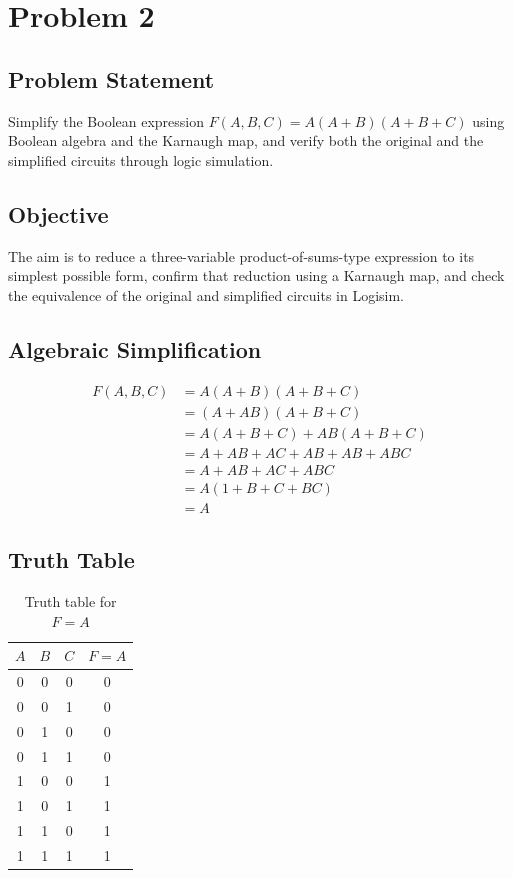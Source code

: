 \documentclass[12pt,a4paper]{article}
\begin{document}
\clearpage
\section*{Problem 2}

\subsection*{Problem Statement}
Simplify the Boolean expression $F(A,B,C) = A(A+B)(A+B+C)$ using Boolean algebra and the Karnaugh map, and verify both the original and the simplified circuits through logic simulation.

\subsection*{Objective}
The aim is to reduce a three-variable product-of-sums-type expression to its simplest possible form, confirm that reduction using a Karnaugh map, and check the equivalence of the original and simplified circuits in Logisim.

\subsection*{Algebraic Simplification}
\begin{align*}
F(A,B,C) &= A(A+B)(A+B+C) \\
         &= (A + AB)(A+B+C) \\
         &= A(A+B+C) + AB(A+B+C) \\
         &= A + AB + AC + AB + AB + ABC \\
         &= A + AB + AC + ABC \\
         &= A(1 + B + C + BC) \\
         &= A
\end{align*}

\subsection*{Truth Table}
\begin{table}[H]
\centering
\renewcommand{\arraystretch}{1.15}
\begin{tabular}{|c|c|c|c|}
\hline
\textbf{$A$} & \textbf{$B$} & \textbf{$C$} & \textbf{$F = A$} \\
\hline
0 & 0 & 0 & 0 \\
\hline
0 & 0 & 1 & 0 \\
\hline
0 & 1 & 0 & 0 \\
\hline
0 & 1 & 1 & 0 \\
\hline
1 & 0 & 0 & 1 \\
\hline
1 & 0 & 1 & 1 \\
\hline
1 & 1 & 0 & 1 \\
\hline
1 & 1 & 1 & 1 \\
\hline
\end{tabular}
\caption{Truth table for $F = A$}
\label{tab:p2-truth}
\end{table}
\end{document}
